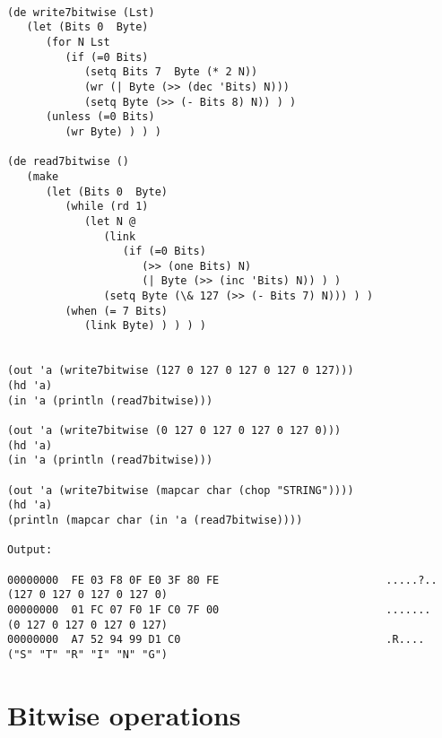 \begin{verbatim}

(de write7bitwise (Lst)
   (let (Bits 0  Byte)
      (for N Lst
         (if (=0 Bits)
            (setq Bits 7  Byte (* 2 N))
            (wr (| Byte (>> (dec 'Bits) N)))
            (setq Byte (>> (- Bits 8) N)) ) )
      (unless (=0 Bits)
         (wr Byte) ) ) )

(de read7bitwise ()
   (make
      (let (Bits 0  Byte)
         (while (rd 1)
            (let N @
               (link
                  (if (=0 Bits)
                     (>> (one Bits) N)
                     (| Byte (>> (inc 'Bits) N)) ) )
               (setq Byte (\& 127 (>> (- Bits 7) N))) ) )
         (when (= 7 Bits)
            (link Byte) ) ) ) )


(out 'a (write7bitwise (127 0 127 0 127 0 127 0 127)))
(hd 'a)
(in 'a (println (read7bitwise)))

(out 'a (write7bitwise (0 127 0 127 0 127 0 127 0)))
(hd 'a)
(in 'a (println (read7bitwise)))

(out 'a (write7bitwise (mapcar char (chop "STRING"))))
(hd 'a)
(println (mapcar char (in 'a (read7bitwise))))

Output:

00000000  FE 03 F8 0F E0 3F 80 FE                          .....?..
(127 0 127 0 127 0 127 0)
00000000  01 FC 07 F0 1F C0 7F 00                          .......
(0 127 0 127 0 127 0 127)
00000000  A7 52 94 99 D1 C0                                .R....
("S" "T" "R" "I" "N" "G")

\end{verbatim}

\section*{Bitwise operations}

